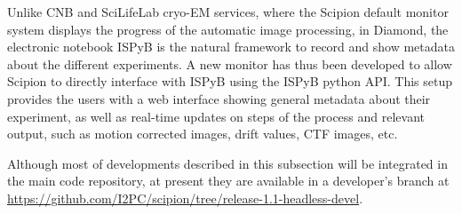 Unlike CNB and SciLifeLab cryo-EM services, where the
Scipion default monitor system displays the progress of the automatic image
processing, in Diamond, the electronic notebook ISPyB is the natural framework
to record and show metadata about the different experiments. A new monitor has thus been developed to allow Scipion to directly interface with ISPyB using the ISPyB python API.
This setup provides the users with a web interface showing general metadata about their experiment, as well as  real-time updates on steps of the process and relevant output, such as motion corrected images, drift values, CTF images, etc.

Although most of developments described in this subsection will be integrated in the main \scipion code repository, at present they are available in a developer's branch  at \url{https://github.com/I2PC/scipion/tree/release-1.1-headless-devel}.
